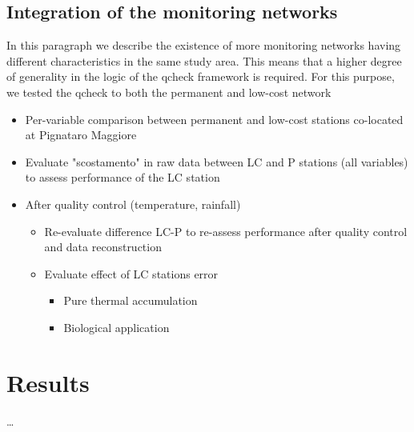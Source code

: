 \documentclass[authoryear,preprint,review,12pt]{elsarticle}
\begin{document}
\subsection{Integration of the monitoring networks}\label{Integration}
In this paragraph we describe the existence of more monitoring networks having different characteristics in the same study area.
This means that a higher degree of generality in the logic of the qcheck framework is required.
For this purpose, we tested the qcheck to both the permanent and low-cost network
\begin{itemize}
    \item Per-variable comparison between permanent and low-cost stations co-located at Pignataro Maggiore
    \item Evaluate "scostamento" in raw data between LC and P stations (all variables) to assess performance of the LC station
    \item After quality control (temperature, rainfall)
    \begin{itemize}
        \item Re-evaluate difference LC-P to re-assess performance after quality control and data reconstruction 
        \item Evaluate effect of LC stations error
        \begin{itemize}
            \item Pure thermal accumulation
            \item Biological application
        \end{itemize}
    \end{itemize}
\end{itemize}


\section{Results}
\ldots
\end{document}
